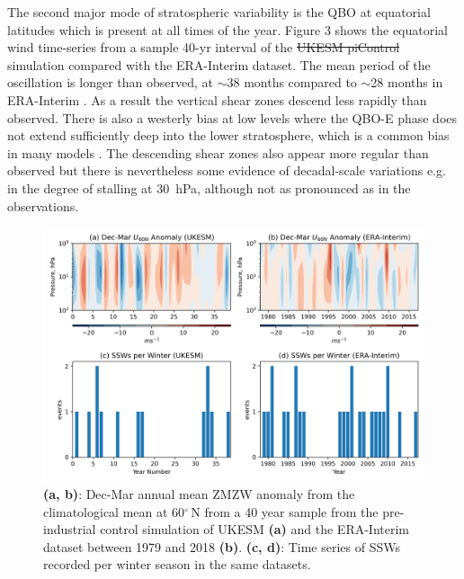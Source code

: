 \documentclass[wcd, manuscript]{copernicus}
\providecommand{\DIFdel}[1]{{\protect\color{red}\sout{#1}}}                      %
\providecommand{\DIFdelbegin}{} %
\providecommand{\DIFdelend}{} %
\begin{document}
The second major mode of stratospheric variability is the QBO at equatorial latitudes which is present at all times of the year. Figure 3 shows the equatorial wind time-series from a sample 40-yr interval of the \DIFdelbegin \DIFdel{UKESM piControl }\DIFdelend simulation compared with the ERA-Interim dataset. The mean period of the oscillation is longer than observed, at $\sim$38 months compared to $\sim$28 months in ERA-Interim \citep{Kawatani2016}. As a result the vertical shear zones descend less rapidly than observed. There is also a westerly bias at low levels where the QBO-E phase does not extend sufficiently deep into the lower stratosphere, which is a common bias in many models \citep{Bushell2020}. The descending shear zones also appear more regular than observed but there is nevertheless some evidence of decadal-scale variations e.g. in the degree of stalling at 30\ hPa, although not as pronounced as in the observations.

\begin{center}
\begin{figure}[h!]
\noindent\includegraphics[width = \linewidth]{figures/SSW_series_fig1.png}
\caption{\textbf{(a, b)}: Dec-Mar annual mean ZMZW anomaly from the climatological mean at 60$^\circ$\,N from a 40 year sample from the pre-industrial control simulation of UKESM \textbf{(a)} and the ERA-Interim dataset between 1979 and 2018 \textbf{(b)}. \textbf{(c, d)}: Time series of SSWs recorded per winter season in the same datasets.}
\label{fig1}
\end{figure}
\end{center}

\end{document}

